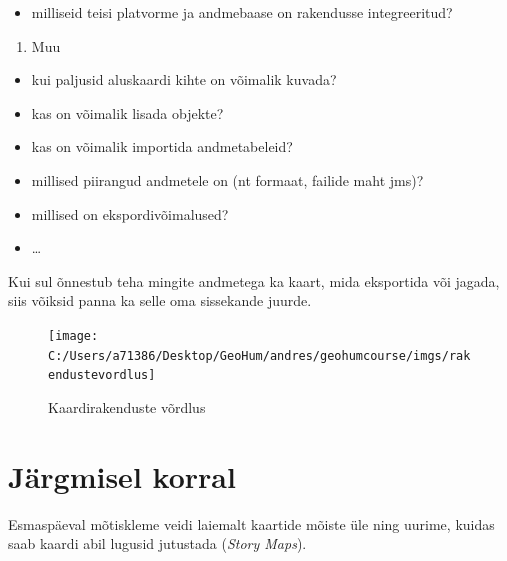 \documentclass[
]{book}
\providecommand{\tightlist}{%
  \setlength{\itemsep}{0pt}\setlength{\parskip}{0pt}}
\begin{document}
\begin{itemize}
\tightlist
\item
  milliseid teisi platvorme ja andmebaase on rakendusse integreeritud?\\
\end{itemize}

\begin{enumerate}
\def\labelenumi{\arabic{enumi}.}
\setcounter{enumi}{3}
\tightlist
\item
  Muu
\end{enumerate}

\begin{itemize}
\tightlist
\item
  kui paljusid aluskaardi kihte on võimalik kuvada?\\
\item
  kas on võimalik lisada objekte?
\item
  kas on võimalik importida andmetabeleid?
\item
  millised piirangud andmetele on (nt formaat, failide maht jms)?
\item
  millised on ekspordivõimalused?
\item
  \ldots{}
\end{itemize}

Kui sul õnnestub teha mingite andmetega ka kaart, mida eksportida või jagada, siis võiksid panna ka selle oma sissekande juurde.

\begin{figure}

{\centering \texttt{[image: C:/Users/a71386/Desktop/GeoHum/andres/geohumcourse/imgs/rakendustevordlus]} 

}

\caption{Kaardirakenduste võrdlus}\label{fig:rakendused}
\end{figure}

\hypertarget{juxe4rgmisel-korral-2}{%
\section{Järgmisel korral}\label{juxe4rgmisel-korral-2}}

Esmaspäeval mõtiskleme veidi laiemalt kaartide mõiste üle ning uurime, kuidas saab kaardi abil lugusid jutustada (\emph{Story Maps}).

  
\end{document}
